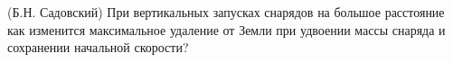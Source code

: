 (Б.Н. Садовский)
При вертикальных запусках снарядов на большое расстояние как изменится
максимальное удаление от Земли при удвоении массы снаряда и сохранении
начальной скорости?
